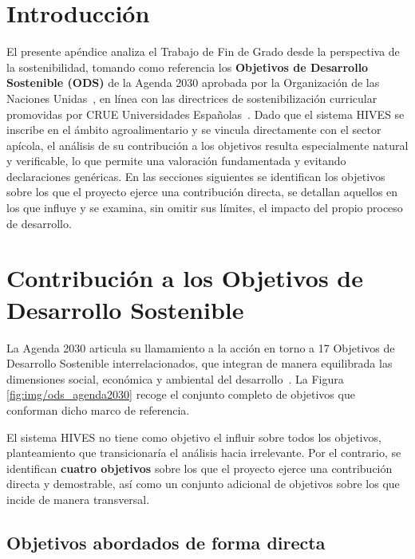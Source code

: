  
\section{Introducción}
 
El presente apéndice analiza el Trabajo de Fin de Grado desde la perspectiva de
la sostenibilidad, tomando como referencia los \textbf{Objetivos de
Desarrollo Sostenible (ODS)} de la Agenda 2030 aprobada por la Organización de
las Naciones Unidas~\cite{onu:agenda2030}, en línea con las directrices de
sostenibilización curricular promovidas por CRUE Universidades
Españolas~\cite{crue:sostenibilidad}. Dado que el sistema HIVES se inscribe en el
ámbito agroalimentario y se vincula directamente con el sector apícola, el
análisis de su contribución a los objetivos resulta especialmente natural y
verificable, lo que permite una valoración fundamentada y evitando
declaraciones genéricas. En las secciones siguientes se identifican los objetivos
sobre los que el proyecto ejerce una contribución directa, se detallan aquellos
en los que influye y se examina, sin omitir sus límites, el impacto
del propio proceso de desarrollo.
 
\section{Contribución a los Objetivos de Desarrollo Sostenible}
 
La Agenda 2030 articula su llamamiento a la acción en torno a 17 Objetivos de
Desarrollo Sostenible interrelacionados, que integran de manera equilibrada las
dimensiones social, económica y ambiental del desarrollo~\cite{onu:agenda2030}.
La Figura \ref{fig:img/ods_agenda2030} recoge el conjunto completo de objetivos que conforman dicho
marco de referencia.
 
 
El sistema HIVES no tiene como objetivo el influir sobre todos
los objetivos, planteamiento que transicionaría el análisis hacia irrelevante.
Por el contrario, se identifican \textbf{cuatro objetivos} sobre los que el
proyecto ejerce una contribución directa y demostrable, así como un conjunto
adicional de objetivos sobre los que incide de manera transversal.
 
\subsection{Objetivos abordados de forma directa}
 

